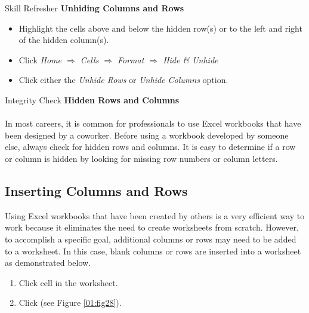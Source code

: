 \begin{center}
	\begin{sklbox}{Skill Refresher}
		\textbf{Unhiding Columns and Rows}
		\\
		\begin{itemize}
			\setlength{\itemsep}{0pt}
			\setlength{\parskip}{0pt}
			\setlength{\parsep}{0pt}
			
			\item Highlight the cells above and below the hidden row(s) or to the left and right of the hidden column(s).
			\item Click \textit{Home $ \Rightarrow $ Cells $ \Rightarrow $ Format $ \Rightarrow $ Hide \& Unhide}
			\item Click either the \textit{Unhide Rows} or \textit{Unhide Columns} option.
			
		\end{itemize}
	\end{sklbox}
\end{center}

\begin{center}
	\begin{infobox}{Integrity Check}
		\textbf{Hidden Rows and Columns}
		\\
		\\
		In most careers, it is common for professionals to use Excel workbooks that have been designed by a coworker. Before using a workbook developed by someone else, always check for hidden rows and columns. It is easy to determine if a row or column is hidden by looking for missing row  numbers or column letters.
	\end{infobox}
\end{center}

\subsection{Inserting Columns and Rows}

Using Excel workbooks that have been created by others is a very efficient way to work because it eliminates the need to create worksheets from scratch. However, to accomplish a specific goal, additional columns or rows may need to be added to a worksheet. In this case, blank columns or rows are inserted into a worksheet as demonstrated below.

\begin{enumerate}
	\item Click cell  in the  worksheet.
	\item Click  (see Figure \ref{01:fig28}).
\end{enumerate}

